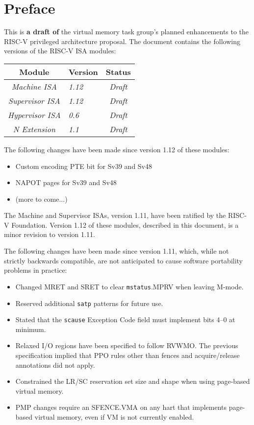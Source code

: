 \chapter{Preface}

This is {\bf a draft of} the virtual memory task group's planned enhancements to the RISC-V privileged
architecture proposal.
The document contains the following versions of the RISC-V ISA
modules:

{
\begin{table}[hbt]
  \centering
  \begin{tabular}{|c|l|c|}
    \hline
    Module             & Version  & Status\\
    \hline
    \em Machine ISA    & \em 1.12 & \em Draft \\
    \em Supervisor ISA & \em 1.12 & \em Draft \\
    \em Hypervisor ISA & \em 0.6  & \em Draft \\
    \em N Extension    & \em 1.1 & \em Draft \\
    \hline
  \end{tabular}
\end{table}
}

The following changes have been made since version 1.12 of these modules:
\vspace{-0.2in}
\begin{itemize}
  \item Custom encoding PTE bit for Sv39 and Sv48
  \item NAPOT pages for Sv39 and Sv48
  \item (more to come...)
\end{itemize}

The Machine and Supervisor ISAs, version 1.11, have been ratified by
the RISC-V Foundation.  Version 1.12 of these modules, described in
this document, is a minor revision to version 1.11.

The following changes have been made since version 1.11, which, while not
strictly backwards compatible, are not anticipated to cause software
portability problems in practice:
\vspace{-0.2in}
\begin{itemize}
  \parskip 0pt
  \itemsep 1pt
\item Changed MRET and SRET to clear {\tt mstatus}.MPRV when leaving M-mode.
\item Reserved additional {\tt satp} patterns for future use.
\item Stated that the {\tt scause} Exception Code field must implement
  bits 4--0 at minimum.
\item Relaxed I/O regions have been specified to follow RVWMO.  The previous
  specification implied that PPO rules other than fences and acquire/release
  annotations did not apply.
\item Constrained the LR/SC reservation set size and shape when using
  page-based virtual memory.
\item PMP changes require an SFENCE.VMA on any hart that implements
  page-based virtual memory, even if VM is not currently enabled.
\end{itemize}

